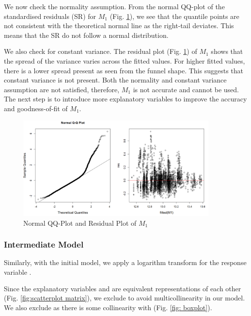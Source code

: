 We now check the normality assumption. From the normal QQ-plot of the standardised residuals (SR) for $M_1$ (Fig. \ref{fig: m1 res plot and qq plot}), we see that the quantile points are not consistent with the theoretical normal line as the right-tail deviates. This means that the SR do not follow a normal distribution. 

We also check for constant variance. The residual plot (Fig. \ref{fig: m1 res plot and qq plot}) of $M_1$ shows that the spread of the variance varies across the fitted values. For higher fitted values, there is a lower spread present as seen from the funnel shape. This suggests that constant variance is not present. Both the normality and constant variance assumption are not satisfied, therefore, $M_1$ is not accurate and cannot be used. The next step is to introduce more explanatory variables to improve the accuracy and goodness-of-fit of $M_1$.

\begin{figure}[!htp]
\centering
    \includegraphics[width=0.9\textwidth]{images/Screenshot 2023-04-11 215131.png}
    \caption{Normal QQ-Plot and Residual Plot of $M_1$}
    \label{fig: m1 res plot and qq plot}
\end{figure}

\subsubsection{Intermediate Model}

Similarly, with the initial model, we apply a logarithm transform for the response variable .

Since the explanatory variables  and  are equivalent representations of each other (Fig. \ref{fig:scatterplot matrix}), we exclude  to avoid multicollinearity in our model. We also exclude  as there is some collinearity with  (Fig. \ref{fig: boxplot}).


